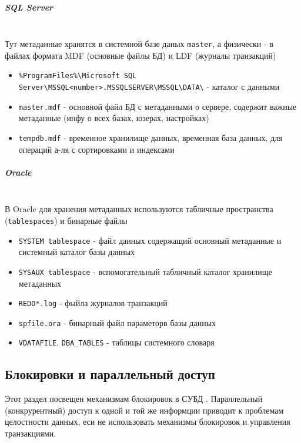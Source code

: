 \subparagraph{SQL Server} \autocite{MicrosoftLearnSQLserverMasterdb,MicrosoftLearnSQLserverTempdb,MicrosoftLearnSQLserverDBfiles,MicrosoftLearnSQLserverFileLoc} ~\\

Тут метаданные хранятся в системной базе даных \texttt{master}, а физически - в файлах формата MDF (основные файлы БД) и LDF (журналы транзакций)

\begin{itemize}
    \item \texttt{\%ProgramFiles\%\textbackslash{}Microsoft SQL Server\textbackslash{}MSSQL<number>.MSSQLSERVER\textbackslash{}MSSQL\textbackslash{}DATA\textbackslash{}} - каталог с данными
    \item \texttt{master.mdf} - основной файл БД с метаданными о сервере, содержит важные метаданные (инфу о всех базах, юзерах, настройках) 
    \item \texttt{tempdb.mdf} - временное хранилище данных, временная база данных, для операций а-ля с сортировками и индексами
\end{itemize}


\subparagraph{Oracle} \autocites[§1.338]{oracledbdoc0}{oracledbdoc4}{OracleRedoLog} ~\\

В Oracle для хранения метаданных используются табличные пространства (\texttt{tablespaces}) и бинарные файлы

\begin{itemize}
    \item \texttt{SYSTEM tablespace} - файл данных содержащий основный метаданные и системный каталог базы данных
    \item \texttt{SYSAUX tablespace} - вспомогательный табличный каталог хранилище метаданных
    \item \texttt{REDO*.log} - фыйла журналов транзакций
    \item \texttt{spfile.ora} - бинарный файл параметорв базы данных
    \item \texttt{V\textdollar DATAFILE}, \texttt{DBA\_TABLES} - таблицы системного словаря
\end{itemize}

\subsection{Блокировки и параллельный доступ}

Этот раздел посвещен механизмам блокировок в СУБД \autocites[c.22]{ElmasriNavathe}[c. 18]{Silberschatz}. Параллельный (конкрурентный) доступ к одной и той же информции приводит к проблемам целостности данных, еси не использовать механизмы блокировок и управления транзакциями.

